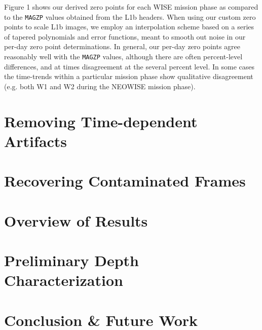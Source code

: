\documentclass{emulateapj}
\begin{document}
Figure 1 shows our derived zero points for each WISE mission phase as 
compared to the \verb|MAGZP| values obtained from the L1b headers. When
using our custom zero points to scale L1b images, we employ an 
interpolation scheme based on a series of tapered polynomials and 
error functions, meant to smooth out noise in our per-day zero point
determinations. In general, our per-day zero points agree reasonably
well with the \verb|MAGZP| values, although there are often 
percent-level differences, and at times disagreement at the several percent
level. In some cases the time-trends within a particular mission phase
show qualitative disagreement (e.g. both W1 and W2 during the NEOWISE
mission phase).



\section{Removing Time-dependent Artifacts}
\label{sec:moon}

\section{Recovering Contaminated Frames}
\label{sec:recover}

\section{Overview of Results}
\label{sec:results}

\section{Preliminary Depth Characterization}
\label{sec:depth}

\section{Conclusion \& Future Work}
\label{sec:future}







\end{document}
